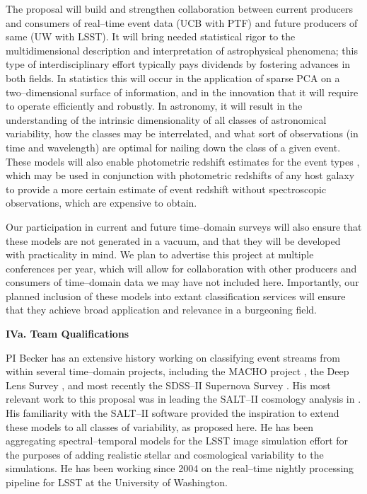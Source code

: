 The proposal will build and strengthen collaboration between current producers
and consumers of real--time event data (UCB with PTF) and future producers of
same (UW with LSST).  It will bring needed statistical rigor to the
multidimensional description and interpretation of astrophysical phenomena; this
type of interdisciplinary effort typically pays dividends by fostering advances
in both fields.  In statistics this will occur in the application of sparse PCA
on a two--dimensional surface of information, and in the innovation that it will
require to operate efficiently and robustly.  In astronomy, it will result in
the understanding of the intrinsic dimensionality of all classes of astronomical
variability, how the classes may be interrelated, and what sort of observations
(in time and wavelength) are optimal for nailing down the class of a given
event.  These models will also enable photometric redshift estimates for the
event types \citep[e.g.][]{2010ApJ...717...40K}, which may be used in
conjunction with photometric redshifts of any host galaxy
\citep[e.g.][]{1962IAUS...15..390B} to provide a more certain estimate of event
redshift without spectroscopic observations, which are expensive to obtain.

Our participation in current and future time--domain surveys will also ensure
that these models are not generated in a vacuum, and that they will be developed
with practicality in mind.  We plan to advertise this project at multiple
conferences per year, which will allow for collaboration with other producers
and consumers of time--domain data we may have not included here. Importantly,
our planned inclusion of these models into extant classification services will
ensure that they achieve broad application and relevance in a burgeoning field.


\bigskip \centerline{\bf IVa. Team Qualifications} \smallskip

 \smallskip

PI Becker has an extensive history working on classifying event streams from
within several time--domain projects, including the MACHO project
\citep{2000PhDT.......258B}, the Deep Lens Survey \citep{2004ApJ...611..418B},
and most recently the SDSS--II Supernova Survey
\citep{2008AJ....135..338F,2008AJ....135..348S}.  His most relevant work to this
proposal was in leading the SALT--II cosmology analysis in
\cite{2009ApJS..185...32K}.  His familiarity with the SALT--II software provided
the inspiration to extend these models to all classes of variability, as
proposed here. He has been aggregating spectral--temporal models for the LSST
image simulation effort \citep{2010SPIE.7738E..53C} for the purposes of adding
realistic stellar and cosmological variability to the simulations.  He has been
working since 2004 on the real--time nightly processing pipeline for LSST at the
University of Washington.

